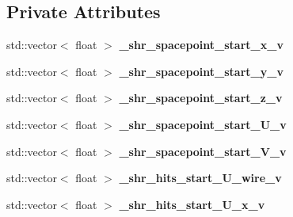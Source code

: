 \subsection*{Private Attributes}
\begin{DoxyCompactItemize}
\item 
std\+::vector$<$ float $>$ {\bfseries \+\_\+shr\+\_\+spacepoint\+\_\+start\+\_\+x\+\_\+v}\hypertarget{classanalysis_1_1ShowerStartPoint_ab1a5f63745829c06c4ee7a30db99b47b}{}\label{classanalysis_1_1ShowerStartPoint_ab1a5f63745829c06c4ee7a30db99b47b}

\item 
std\+::vector$<$ float $>$ {\bfseries \+\_\+shr\+\_\+spacepoint\+\_\+start\+\_\+y\+\_\+v}\hypertarget{classanalysis_1_1ShowerStartPoint_a9284ff719c659b758bfb91b18ddbd72c}{}\label{classanalysis_1_1ShowerStartPoint_a9284ff719c659b758bfb91b18ddbd72c}

\item 
std\+::vector$<$ float $>$ {\bfseries \+\_\+shr\+\_\+spacepoint\+\_\+start\+\_\+z\+\_\+v}\hypertarget{classanalysis_1_1ShowerStartPoint_a07a6b32d99fc862660a9bcfc735f71e1}{}\label{classanalysis_1_1ShowerStartPoint_a07a6b32d99fc862660a9bcfc735f71e1}

\item 
std\+::vector$<$ float $>$ {\bfseries \+\_\+shr\+\_\+spacepoint\+\_\+start\+\_\+\+U\+\_\+v}\hypertarget{classanalysis_1_1ShowerStartPoint_ae4900f655cd3af95549d5063c662c8f6}{}\label{classanalysis_1_1ShowerStartPoint_ae4900f655cd3af95549d5063c662c8f6}

\item 
std\+::vector$<$ float $>$ {\bfseries \+\_\+shr\+\_\+spacepoint\+\_\+start\+\_\+\+V\+\_\+v}\hypertarget{classanalysis_1_1ShowerStartPoint_af1f9e524dd586a6a460c1b215f21165a}{}\label{classanalysis_1_1ShowerStartPoint_af1f9e524dd586a6a460c1b215f21165a}

\item 
std\+::vector$<$ float $>$ {\bfseries \+\_\+shr\+\_\+hits\+\_\+start\+\_\+\+U\+\_\+wire\+\_\+v}\hypertarget{classanalysis_1_1ShowerStartPoint_a2f08520bb3b2b366c56585094d44b30f}{}\label{classanalysis_1_1ShowerStartPoint_a2f08520bb3b2b366c56585094d44b30f}

\item 
std\+::vector$<$ float $>$ {\bfseries \+\_\+shr\+\_\+hits\+\_\+start\+\_\+\+U\+\_\+x\+\_\+v}\hypertarget{classanalysis_1_1ShowerStartPoint_a1d6cfc632ab221e7a11856b504630df8}{}\label{classanalysis_1_1ShowerStartPoint_a1d6cfc632ab221e7a11856b504630df8}


\end{DoxyCompactItemize}
